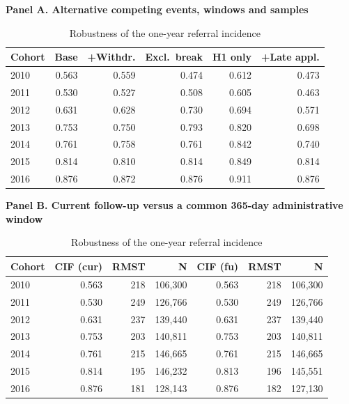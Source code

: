 \begin{table}[htbp]\centering
\caption{Robustness of the one-year referral incidence}
\label{tab:P2rob}
\label{tab:P2fu}
\footnotesize
\par\medskip\textbf{Panel A. Alternative competing events, windows and samples}\par\smallskip
\begin{tabular}{lrrrrr}
\toprule
Cohort & Base & +Withdr. & Excl.\ break & H1 only & +Late appl. \\
\midrule
2010 & 0.563 & 0.559 & 0.474 & 0.612 & 0.473 \\
2011 & 0.530 & 0.527 & 0.508 & 0.605 & 0.463 \\
2012 & 0.631 & 0.628 & 0.730 & 0.694 & 0.571 \\
2013 & 0.753 & 0.750 & 0.793 & 0.820 & 0.698 \\
2014 & 0.761 & 0.758 & 0.761 & 0.842 & 0.740 \\
2015 & 0.814 & 0.810 & 0.814 & 0.849 & 0.814 \\
2016 & 0.876 & 0.872 & 0.876 & 0.911 & 0.876 \\
\bottomrule
\end{tabular}
\par\medskip\textbf{Panel B. Current follow-up versus a common 365-day administrative window}\par\smallskip
\begin{tabular}{lrrrrrr}
\toprule
Cohort & CIF (cur) & RMST & N & CIF (fu) & RMST & N \\
\midrule
2010 & 0.563 & 218 & 106,300 & 0.563 & 218 & 106,300 \\
2011 & 0.530 & 249 & 126,766 & 0.530 & 249 & 126,766 \\
2012 & 0.631 & 237 & 139,440 & 0.631 & 237 & 139,440 \\
2013 & 0.753 & 203 & 140,811 & 0.753 & 203 & 140,811 \\
2014 & 0.761 & 215 & 146,665 & 0.761 & 215 & 146,665 \\
2015 & 0.814 & 195 & 146,232 & 0.813 & 196 & 145,551 \\
2016 & 0.876 & 181 & 128,143 & 0.876 & 182 & 127,130 \\
\bottomrule
\end{tabular}
\end{table}
